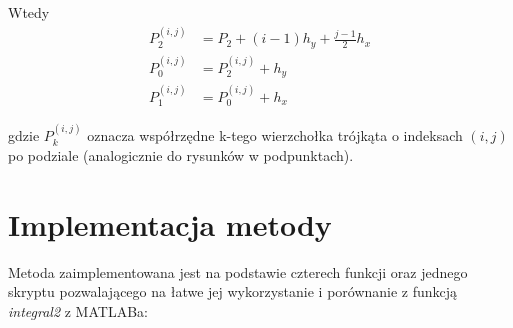 \documentclass[12pt]{article}
\begin{document}
\begin{enumerate}[label=\textbf{\Roman*}]
		Wtedy
		\begin{align*}
			P_2^{(i,j)} & = P_2 + (i-1)h_y + \frac{j-1}{2}h_x \\
			P_0^{(i,j)} & = P_2^{(i,j)} + h_y                 \\
			P_1^{(i,j)} & = P_0^{(i,j)} + h_x
		\end{align*}
	\end{enumerate}
	gdzie $P_k^{(i,j)}$ oznacza współrzędne k-tego wierzchołka trójkąta o indeksach $(i, j)$ po podziale (analogicznie do rysunków w podpunktach).
	
	
	
	
	
	\section{Implementacja metody}
	Metoda zaimplementowana jest na podstawie czterech funkcji oraz jednego skryptu pozwalającego na łatwe jej wykorzystanie i porównanie z funkcją \textit{integral2} z MATLABa:
\end{document}
